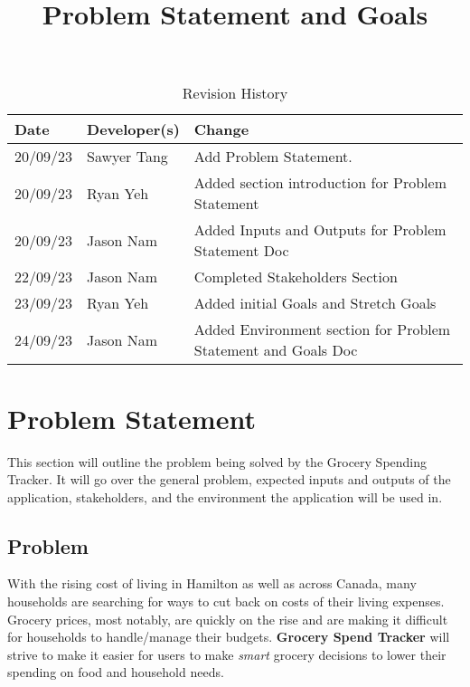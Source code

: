 \documentclass{article}
\title{Problem Statement and Goals\\\progname}
\author{\authname}
\date{}
\begin{document}
\maketitle

\begin{table}[hp]
\caption{Revision History} \label{TblRevisionHistory}
\begin{tabularx}{\textwidth}{llX}
\toprule
\textbf{Date} & \textbf{Developer(s)} & \textbf{Change}\\
\midrule
20/09/23 & Sawyer Tang & Add Problem Statement.\\
20/09/23 & Ryan Yeh & Added section introduction for Problem Statement\\
20/09/23 & Jason Nam & Added Inputs and Outputs for Problem Statement Doc\\
22/09/23 & Jason Nam & Completed Stakeholders Section\\
23/09/23 & Ryan Yeh & Added initial Goals and Stretch Goals\\
24/09/23 & Jason Nam & Added Environment section for Problem Statement and Goals Doc\\
\bottomrule
\end{tabularx}
\end{table}

\section{Problem Statement}


This section will outline the problem being solved by the Grocery Spending Tracker. It will go
over the general problem, expected inputs and outputs of the application, stakeholders, and the environment
the application will be used in.

\subsection{Problem}

With the rising cost of living in Hamilton as well as across Canada, many households are searching for ways to cut back on costs of their living expenses. Grocery prices, most notably, are quickly on the rise and are making it difficult for households to handle/manage their budgets. \textbf{Grocery Spend Tracker} will strive to make it easier for users to make \textit{smart} grocery decisions to lower their spending on food and household needs.
\end{document}
